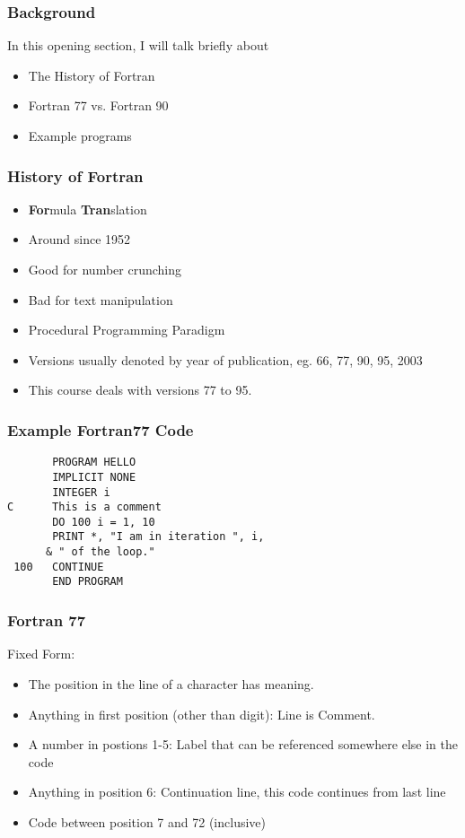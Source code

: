 \begin{frame}
  \frametitle{Background}
  In this opening section, I will talk briefly about
  \begin{itemize}
    \item The History of Fortran
    \item Fortran 77 vs. Fortran 90
    \item Example programs
  \end{itemize}
\end{frame}

\begin{frame}
  \frametitle{History of Fortran}
  \begin{itemize}
    \item \textbf{For}mula \textbf{Tran}slation
    \item Around since 1952
    \item Good for number crunching
    \item Bad for text manipulation
    \item Procedural Programming Paradigm
    \item Versions usually denoted by year of publication, eg. 66, 77, 90, 95, 2003
    \item This course deals with versions 77 to 95.
  \end{itemize}
\end{frame}

\begin{frame}[fragile]
  \frametitle{Example Fortran77 Code}
  \begin{lstlisting}
       PROGRAM HELLO
       IMPLICIT NONE
       INTEGER i
C      This is a comment
       DO 100 i = 1, 10
       PRINT *, "I am in iteration ", i,
      & " of the loop."
 100   CONTINUE
       END PROGRAM
  \end{lstlisting}
\end{frame}

\begin{frame}
  \frametitle{Fortran 77}
  Fixed Form:
  \begin{itemize}
       \item The position in the line of a character has meaning.
       \item Anything in first position (other than digit): 
             Line is Comment.
       \item A number in postions 1-5: 
             Label that can be referenced somewhere else in the code
       \item Anything in position 6:
             Continuation line, this code continues from last line
       \item Code between position 7 and 72 (inclusive)
  \end{itemize}
\end{frame}

